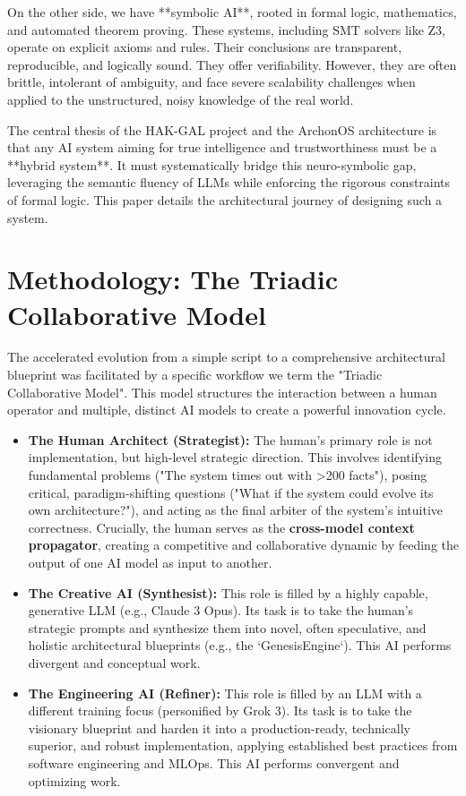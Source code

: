 \documentclass[11pt, a4paper]{article}
\begin{document}
On the other side, we have **symbolic AI**, rooted in formal logic, mathematics, and automated theorem proving. These systems, including SMT solvers like Z3, operate on explicit axioms and rules. Their conclusions are transparent, reproducible, and logically sound. They offer verifiability. However, they are often brittle, intolerant of ambiguity, and face severe scalability challenges when applied to the unstructured, noisy knowledge of the real world.

The central thesis of the HAK-GAL project and the ArchonOS architecture is that any AI system aiming for true intelligence and trustworthiness must be a **hybrid system**. It must systematically bridge this neuro-symbolic gap, leveraging the semantic fluency of LLMs while enforcing the rigorous constraints of formal logic. This paper details the architectural journey of designing such a system.

\section{Methodology: The Triadic Collaborative Model}
\label{sec:methodology}
The accelerated evolution from a simple script to a comprehensive architectural blueprint was facilitated by a specific workflow we term the "Triadic Collaborative Model". This model structures the interaction between a human operator and multiple, distinct AI models to create a powerful innovation cycle.

\begin{itemize}
    \item \textbf{The Human Architect (Strategist):} The human's primary role is not implementation, but high-level strategic direction. This involves identifying fundamental problems ("The system times out with >200 facts"), posing critical, paradigm-shifting questions ("What if the system could evolve its own architecture?"), and acting as the final arbiter of the system's intuitive correctness. Crucially, the human serves as the \textbf{cross-model context propagator}, creating a competitive and collaborative dynamic by feeding the output of one AI model as input to another.
    
    \item \textbf{The Creative AI (Synthesist):} This role is filled by a highly capable, generative LLM (e.g., Claude 3 Opus). Its task is to take the human's strategic prompts and synthesize them into novel, often speculative, and holistic architectural blueprints (e.g., the `GenesisEngine`). This AI performs divergent and conceptual work.
    
    \item \textbf{The Engineering AI (Refiner):} This role is filled by an LLM with a different training focus (personified by Grok 3). Its task is to take the visionary blueprint and harden it into a production-ready, technically superior, and robust implementation, applying established best practices from software engineering and MLOps. This AI performs convergent and optimizing work.
\end{itemize}
\end{document}
